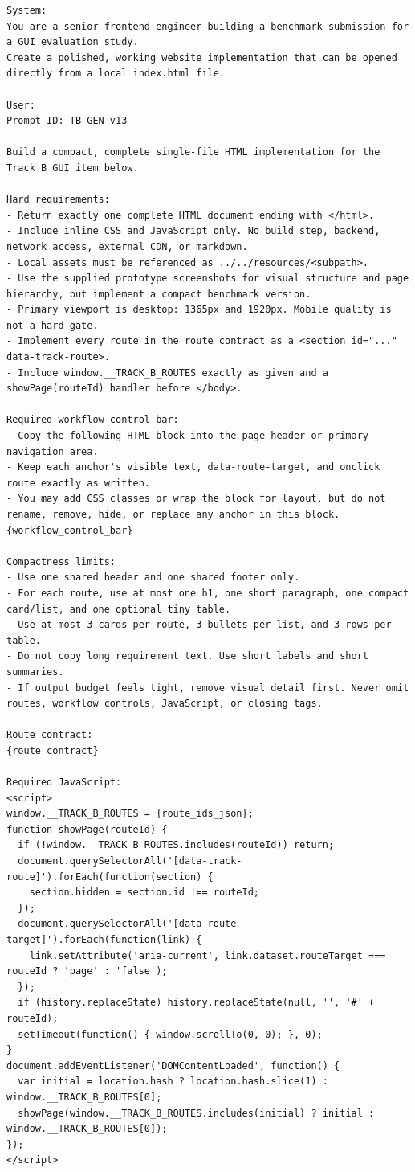\begingroup
\scriptsize
\begin{verbatim}
System:
You are a senior frontend engineer building a benchmark submission for a GUI evaluation study.
Create a polished, working website implementation that can be opened directly from a local index.html file.

User:
Prompt ID: TB-GEN-v13

Build a compact, complete single-file HTML implementation for the Track B GUI item below.

Hard requirements:
- Return exactly one complete HTML document ending with </html>.
- Include inline CSS and JavaScript only. No build step, backend, network access, external CDN, or markdown.
- Local assets must be referenced as ../../resources/<subpath>.
- Use the supplied prototype screenshots for visual structure and page hierarchy, but implement a compact benchmark version.
- Primary viewport is desktop: 1365px and 1920px. Mobile quality is not a hard gate.
- Implement every route in the route contract as a <section id="..." data-track-route>.
- Include window.__TRACK_B_ROUTES exactly as given and a showPage(routeId) handler before </body>.

Required workflow-control bar:
- Copy the following HTML block into the page header or primary navigation area.
- Keep each anchor's visible text, data-route-target, and onclick route exactly as written.
- You may add CSS classes or wrap the block for layout, but do not rename, remove, hide, or replace any anchor in this block.
{workflow_control_bar}

Compactness limits:
- Use one shared header and one shared footer only.
- For each route, use at most one h1, one short paragraph, one compact card/list, and one optional tiny table.
- Use at most 3 cards per route, 3 bullets per list, and 3 rows per table.
- Do not copy long requirement text. Use short labels and short summaries.
- If output budget feels tight, remove visual detail first. Never omit routes, workflow controls, JavaScript, or closing tags.

Route contract:
{route_contract}

Required JavaScript:
<script>
window.__TRACK_B_ROUTES = {route_ids_json};
function showPage(routeId) {
  if (!window.__TRACK_B_ROUTES.includes(routeId)) return;
  document.querySelectorAll('[data-track-route]').forEach(function(section) {
    section.hidden = section.id !== routeId;
  });
  document.querySelectorAll('[data-route-target]').forEach(function(link) {
    link.setAttribute('aria-current', link.dataset.routeTarget === routeId ? 'page' : 'false');
  });
  if (history.replaceState) history.replaceState(null, '', '#' + routeId);
  setTimeout(function() { window.scrollTo(0, 0); }, 0);
}
document.addEventListener('DOMContentLoaded', function() {
  var initial = location.hash ? location.hash.slice(1) : window.__TRACK_B_ROUTES[0];
  showPage(window.__TRACK_B_ROUTES.includes(initial) ? initial : window.__TRACK_B_ROUTES[0]);
});
</script>


\end{verbatim}
